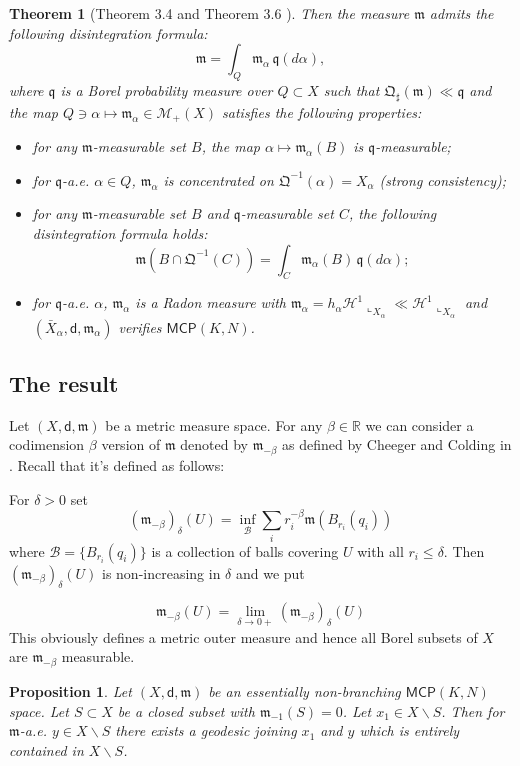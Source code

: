 \documentclass[a4paper]{amsart}
\theoremstyle{plain}
\newtheorem{theorem}[lemma]{Theorem}
\newtheorem{proposition}[lemma]{Proposition}
\theoremstyle{definition}
\numberwithin{equation}{section}
\newcommand{\R}{\mathbb{R}}
\newcommand{\MCP}{\mathsf{MCP}}
\newcommand{\mm}{\mathfrak m}
\newcommand{\qq}{\mathfrak q}
\newcommand{\QQ}{\mathfrak Q}
\newcommand{\sfd}{\mathsf d}
\newcommand{\cH}{\mathcal{H}}
\begin{document}
{{\begin{theorem}[Theorem 3.4 and Theorem 3.6 \cite{CaMo}]
Then  the measure $\mm$ admits the following disintegration formula: 
%
$$
\mm = \int_{Q} \mm_{\alpha} \, \qq(d\alpha),
$$
%
where $\qq$ is a Borel probability measure over $Q \subset X$ such that 
$\QQ_{\sharp}( \mm ) \ll \qq$ and the map 
$Q \ni \alpha \mapsto \mm_{\alpha} \in \mathcal{M}_{+}(X)$ satisfies the following properties:
\begin{itemize}
%
\item[(1)] for any $\mm$-measurable set $B$, the map $\alpha \mapsto \mm_{\alpha}(B)$ is $\qq$-measurable; \smallskip
%
\item[(2)] for $\qq$-a.e. $\alpha \in Q$, $\mm_{\alpha}$ is concentrated on $\QQ^{-1}(\alpha) = X_{\alpha}$ (strong consistency); \smallskip
%
\item[(3)] for any $\mm$-measurable set $B$ and $\qq$-measurable set $C$, the following disintegration formula holds: 
%
$$
\mm(B \cap \QQ^{-1}(C)) = \int_{C} \mm_{\alpha}(B) \, \qq(d\alpha);
$$
\item[(4)] for $\qq$-a.e. $\alpha$, $\mm_{\alpha}$ is a Radon measure  with $\mm_{\alpha}=h_{\alpha} \cH^{1}\llcorner_{X_{\alpha}} \ll \cH^{1}\llcorner_{X_{\alpha}}$
and $(\bar X_{\alpha},\sfd,\mm_{\alpha})$ verifies $\MCP(K,N)$. 
%
\end{itemize}
\end{theorem}

}

\subsection{The result}



Let $(X,\sfd, \mm)$ be a metric measure space. For any $\beta\in \R$  we can consider a codimension $\beta$ version of $\mm$ denoted by $\mm_{-\beta}$ as defined by Cheeger and Colding in \cite[Section 2]{CC00a}.
Recall that it's defined as follows:

For $\delta>0$ set 
\[
(\mm_{-\beta})_\delta(U)=\inf_{\mathcal B} \sum_i r_i^{-\beta}\mm(B_{r_i}(q_i))
\]
where $\mathcal B=\{B_{r_i}(q_i)\}$ is a collection of balls covering $U$ with all $r_i\le \delta$.
Then $(\mm_{-\beta})_\delta(U)$ is non-increasing in $\delta$ and we put

\[
\mm_{-\beta}(U)=\lim_{\delta\to0+}(\mm_{-\beta})_\delta(U)
\]
This obviously defines a metric outer measure and hence all Borel subsets of $X$ are $\mm_{-\beta}$ measurable.




\begin{proposition}\label{alm-all-geod}
Let $(X,\sfd,\mm)$ be an { essentially non-branching $\MCP(K,N)$ space}. Let $S\subset X$ be a closed subset with $\mm_{-1}(S)=0$. Let $x_1\in X\backslash S$.
Then for $\mm$-a.e. $y\in X\backslash S$  there exists a geodesic joining $x_{1}$ and $y$ which is entirely contained in $X\backslash S$.
\end{proposition}


}
\end{document}
